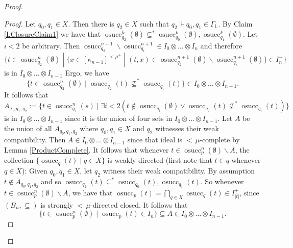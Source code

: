 \documentclass[10pt,a4paper]{amsart}
\DeclareMathOperator{\osucc}{osucc}
\newcommand{\dL}{\mathbb{L}}
\begin{document}
\begin{proof}
		\begin{proof}
			Let $q_0,q_1\in X$. Then there is $q_2\in X$ such that $q_2\Vdash q_0,q_1\in\Gamma_{\dL}$. By Claim \ref{LClosureClaim1} we have that $\osucc_{q_2}^{k}(\emptyset)\subseteq^*\osucc_{q_0}^{k}(\emptyset),\osucc_{q_1}^{k}(\emptyset)$. Let $i<2$ be arbitrary. Then $\osucc_{q_2}^{n+1}\smallsetminus\osucc_{q_i}^{n+1}\in I_0\otimes\dots\otimes I_{n}$ and therefore
			$$\{t\in\osucc_{q_2}^n(\emptyset)\;|\;\{x\in[\kappa_{n-1}]^{<\mu^+}\;|\;(t,x)\in\osucc_{q_2}^{n+1}(\emptyset)\smallsetminus\osucc_{q_i}^{n+1}(\emptyset)\}\in I_n^+\}$$
			is in $I_0\otimes\dots\otimes I_{n-1}$
			Ergo, we have
			$$\{t\in\osucc_{q_2}^n(\emptyset)\;|\;\osucc_{q_2}(t)\not\subseteq^*\osucc_{q_i}(t)\}\in I_0\otimes\dots\otimes I_{n-1}.$$
			It follows that
			$$A_{q_0,q_1,q_2}:=\{t\in\osucc_{q_2}^n(s)\;|\;\exists i<2(t\notin\osucc_{q_i}(\emptyset)\vee\osucc_{q_2}(t)\not\subseteq^*\osucc_{q_i}(t))\}$$
			is in $I_0\otimes\dots\otimes I_{n-1}$ since it is the union of four sets in $I_0\otimes\dots\otimes I_{n-1}$. Let $A$ be the union of all $A_{q_0,q_1,q_2}$ where $q_0,q_1\in X$ and $q_2$ witnesses their weak compatibility. Then $A\in I_0\otimes\dots\otimes I_{n-1}$ since that ideal is ${<}\,\mu$-complete by Lemma \ref{ProductComplete}. It follows that whenever $t\in\osucc_p^n(\emptyset)\smallsetminus A$, the collection $\{\osucc_q(t)\;|\;q\in X\}$ is weakly directed (first note that $t\in q$ whenever $q\in X$): Given $q_0,q_1\in X$, let $q_2$ witness their weak compatibility. By assumption $t\notin A_{q_0,q_1,q_2}$ and so $\osucc_{q_2}(t)\subseteq^*\osucc_{q_0}(t),\osucc_{q_1}(t)$. So whenever $t\in\osucc_p^n(\emptyset)\smallsetminus A$, we have that $\osucc_p(t)=\bigcap_{q\in X}\osucc_q(t)\in I_{|t|}^+$, since $(B_n,\subseteq)$ is strongly ${<}\,\mu$-directed closed. It follows that
			$$\{t\in\osucc_p^n(\emptyset)\;|\;\osucc_p(t)\in I_n\}\subseteq A\in I_0\otimes\dots\otimes I_{n-1}.$$
		\end{proof}
		

\end{proof}
\end{document}
